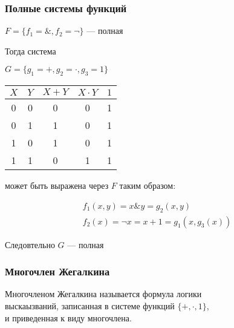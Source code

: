 \documentclass{article}
\begin{document}
\subsubsection{Полные системы функций}

$F = \{ f_1 = \&, f_2 = \lnot \}$ --- полная

Тогда система

$G = \{ g_1 = +, g_2 = \cdot, g_3 = 1 \}$

\begin{tabular}{c|c||c|c|c}
	$X$ & $Y$ & $X + Y$ & $X \cdot Y$ & $1$ \\
	\hline
	0 & 0 & 0 & 0 & 1 \\
	0 & 1 & 1 & 0 & 1 \\
	1 & 0 & 1 & 0 & 1 \\
	1 & 1 & 0 & 1 & 1 \\
\end{tabular}

может быть выражена через $F$ таким образом:

\begin{gather*}
	f_1(x, y) = x \& y = g_2(x, y) \\
	f_2(x) = \lnot x = x + 1 = g_1(x, g_3(x))
\end{gather*}

Следовтельно $G$ --- полная

\subsubsection{Многочлен Жегалкина}

Многочленом Жегалкина называется формула логики  \\
выскаызваний, записанная в системе функций $\{ +, \cdot, 1 \}$, \\
и приведенная к виду многочлена.
\end{document}
